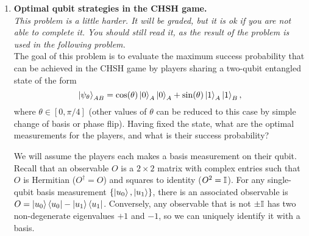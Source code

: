 \documentclass[12pt]{article}
\begin{document}
\begin{enumerate}
		



\item \textbf{Optimal qubit strategies in the CHSH game.}\\
\emph{This problem is a little harder. It will be graded, but it is ok if you are not able to complete it. You should still read it, as the result of the problem is used in the following problem.}\\
The goal of this problem is to evaluate the maximum success probability that can be achieved in the CHSH game by players sharing a two-qubit entangled state of the form 
\begin{equation}\label{eq:psitheta}
\ket{\psi_\theta}_{AB} = \cos(\theta) \ket{0}_A\ket{0}_A + \sin(\theta)\ket{1}_A\ket{1}_B,
\end{equation}
where $\theta \in [0,\pi/4]$ (other values of $\theta$ can be reduced to this case by simple change of basis or phase flip). 
 Having fixed the state, what are the optimal measurements for the players, and what is their success probability? 

We will assume the players each makes a basis measurement on their qubit. Recall that an observable 
 $O$ is a $2\times 2$ matrix with complex entries such that $O$ is Hermitian ($O^\dagger = O$) and squares to identity ($O^2 = \mathbb{I}$). For any single-qubit basis measurement $\{\ket{u_0},\ket{u_1}\}$, there is an associated observable is $O = \ket{u_0}\bra{u_0}-\ket{u_1}\bra{u_1}$. Conversely, any observable that is not $\pm\mathbb{I}$ has two non-degenerate eigenvalues $+1$ and $-1$, so we can uniquely identify it with a basis. 


\end{enumerate}
\end{document}
